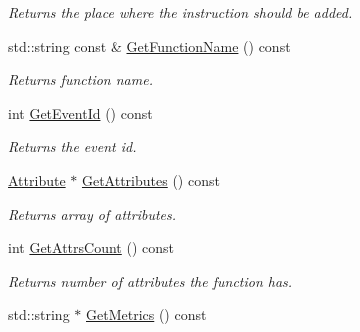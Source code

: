 \begin{DoxyCompactItemize}
\begin{DoxyCompactList}\small\item\em Returns the place where the instruction should be added. \end{DoxyCompactList}\item 
\hypertarget{class_common_1_1_add_instr_request_af7a0c2f2796725b544d32c1fdb3983af}{std\-::string const \& \hyperlink{class_common_1_1_add_instr_request_af7a0c2f2796725b544d32c1fdb3983af}{Get\-Function\-Name} () const }\label{class_common_1_1_add_instr_request_af7a0c2f2796725b544d32c1fdb3983af}

\begin{DoxyCompactList}\small\item\em Returns function name. \end{DoxyCompactList}\item 
\hypertarget{class_common_1_1_add_instr_request_a2b426cdee36bb34befd7c352e311b091}{int \hyperlink{class_common_1_1_add_instr_request_a2b426cdee36bb34befd7c352e311b091}{Get\-Event\-Id} () const }\label{class_common_1_1_add_instr_request_a2b426cdee36bb34befd7c352e311b091}

\begin{DoxyCompactList}\small\item\em Returns the event id. \end{DoxyCompactList}\item 
\hypertarget{class_common_1_1_add_instr_request_a8641c2ae4a2a32535fb73be25ef39eb9}{\hyperlink{class_common_1_1_attribute}{Attribute} $\ast$ \hyperlink{class_common_1_1_add_instr_request_a8641c2ae4a2a32535fb73be25ef39eb9}{Get\-Attributes} () const }\label{class_common_1_1_add_instr_request_a8641c2ae4a2a32535fb73be25ef39eb9}

\begin{DoxyCompactList}\small\item\em Returns array of attributes. \end{DoxyCompactList}\item 
\hypertarget{class_common_1_1_add_instr_request_a969ac38ec14c83e16cbc9c74527f4121}{int \hyperlink{class_common_1_1_add_instr_request_a969ac38ec14c83e16cbc9c74527f4121}{Get\-Attrs\-Count} () const }\label{class_common_1_1_add_instr_request_a969ac38ec14c83e16cbc9c74527f4121}

\begin{DoxyCompactList}\small\item\em Returns number of attributes the function has. \end{DoxyCompactList}\item 
\hypertarget{class_common_1_1_add_instr_request_a5a19a930c393f48dce79c123ca1258ab}{std\-::string $\ast$ \hyperlink{class_common_1_1_add_instr_request_a5a19a930c393f48dce79c123ca1258ab}{Get\-Metrics} () const }\label{class_common_1_1_add_instr_request_a5a19a930c393f48dce79c123ca1258ab}


\end{DoxyCompactItemize}
